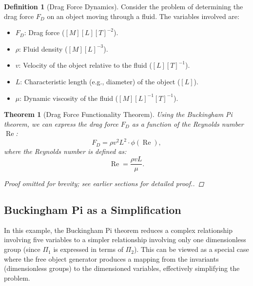 \documentclass{article}
\newtheorem{theorem}{Theorem}[section]
\theoremstyle{definition}
\newtheorem{definition}{Definition}[section]
\theoremstyle{remark}
\begin{document}
	\begin{definition}[Drag Force Dynamics]
		Consider the problem of determining the drag force $F_D$ on an object moving through a fluid. The variables involved are:
		\begin{itemize}
			\item $F_D$: Drag force ($[M][L][T]^{-2}$).
			\item $\rho$: Fluid density ($[M][L]^{-3}$).
			\item $v$: Velocity of the object relative to the fluid ($[L][T]^{-1}$).
			\item $L$: Characteristic length (e.g., diameter) of the object ($[L]$).
			\item $\mu$: Dynamic viscosity of the fluid ($[M][L]^{-1}[T]^{-1}$).
		\end{itemize}
	\end{definition}
	
	\begin{theorem}[Drag Force Functionality Theorem]
		Using the Buckingham Pi theorem, we can express the drag force $F_D$ as a function of the Reynolds number $\operatorname{Re}$:
		\[
		F_D = \rho v^2 L^2 \cdot \phi(\operatorname{Re}),
		\]
		where the Reynolds number is defined as:
		\[
		\operatorname{Re} = \dfrac{\rho v L}{\mu}.
		\]
		
		\begin{proof}
			[Proof omitted for brevity; see earlier sections for detailed proof.]
		\end{proof}
	\end{theorem}
	
	\subsection{Buckingham Pi as a Simplification}
	
	In this example, the Buckingham Pi theorem reduces a complex relationship involving five variables to a simpler relationship involving only one dimensionless group (since $\Pi_1$ is expressed in terms of $\Pi_2$). This can be viewed as a special case where the free object generator produces a mapping from the invariants (dimensionless groups) to the dimensioned variables, effectively simplifying the problem.
	
\end{document}
